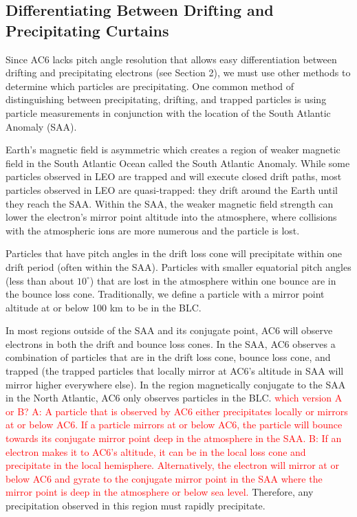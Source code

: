 \documentclass[draft]{agujournal2019}
\begin{document}
\subsection{Differentiating Between Drifting and Precipitating Curtains}
Since AC6 lacks pitch angle resolution that allows easy differentiation between drifting and precipitating electrons (see Section 2), we must use other methods to determine which particles are precipitating. One common method of distinguishing between precipitating, drifting, and trapped particles is using particle measurements in conjunction with the location of the South Atlantic Anomaly (SAA).

Earth's magnetic field is asymmetric which creates a region of weaker magnetic field in the South Atlantic Ocean called the South Atlantic Anomaly. 
While some particles observed in LEO are trapped and will execute closed drift paths, most particles observed in LEO are quasi-trapped: they drift around the Earth until they reach the SAA. Within the SAA, the weaker magnetic field strength can lower the electron's mirror point altitude into the atmosphere, where collisions with the atmospheric ions are more numerous and the particle is lost. 

Particles that have pitch angles in the drift loss cone will precipitate within one drift period (often within the SAA). Particles with smaller equatorial pitch angles (less than about $10^\circ$) that are lost in the atmosphere within one bounce are in the bounce loss cone. Traditionally, we define a particle with a mirror point altitude at or below 100 km to be in the BLC.

In most regions outside of the SAA and its conjugate point, AC6 will observe electrons in both the drift and bounce loss cones. In the SAA, AC6 observes a combination of particles that are in the drift loss cone, bounce loss cone, and trapped (the trapped particles that locally mirror at AC6's altitude in SAA will mirror higher everywhere else). In the region magnetically conjugate to the SAA in the North Atlantic, AC6 only observes particles in the BLC. \textcolor{red}{which version A or B? A: A particle that is observed by AC6 either precipitates locally or mirrors at or below AC6. If a particle mirrors at or below AC6, the particle will bounce towards its conjugate mirror point deep in the atmosphere in the SAA. \newline B: If an electron makes it to AC6's altitude, it can be in the local loss cone and precipitate in the local hemisphere. Alternatively, the electron will mirror at or below AC6 and gyrate to the conjugate mirror point in the SAA where the mirror point is deep in the atmosphere or below sea level.} Therefore, any precipitation observed in this region must rapidly precipitate. 
\end{document}
